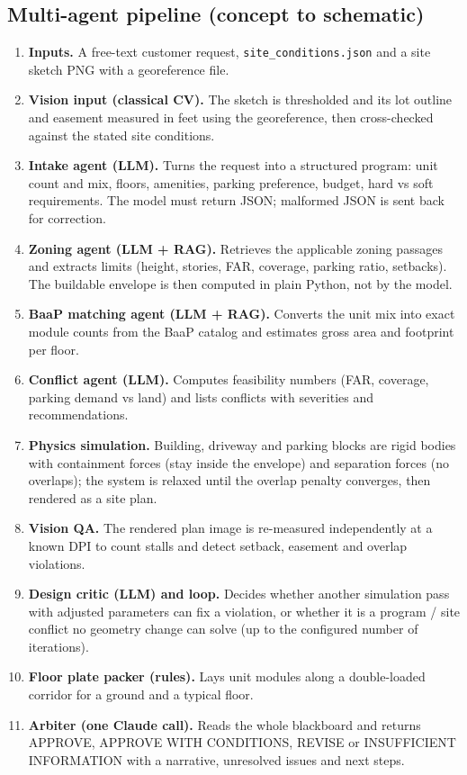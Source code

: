 \documentclass[10pt]{article}
\begin{document}
\subsection{Multi-agent pipeline (concept to schematic)}
\begin{enumerate}
\item \textbf{Inputs.} A free-text customer request, \texttt{site\_conditions.json} and a site sketch PNG with a georeference file.
\item \textbf{Vision input (classical CV).} The sketch is thresholded and its lot outline and easement measured in feet using the georeference, then cross-checked against the stated site conditions.
\item \textbf{Intake agent (LLM).} Turns the request into a structured program: unit count and mix, floors, amenities, parking preference, budget, hard vs soft requirements. The model must return JSON; malformed JSON is sent back for correction.
\item \textbf{Zoning agent (LLM + RAG).} Retrieves the applicable zoning passages and extracts limits (height, stories, FAR, coverage, parking ratio, setbacks). The buildable envelope is then computed in plain Python, not by the model.
\item \textbf{BaaP matching agent (LLM + RAG).} Converts the unit mix into exact module counts from the BaaP catalog and estimates gross area and footprint per floor.
\item \textbf{Conflict agent (LLM).} Computes feasibility numbers (FAR, coverage, parking demand vs land) and lists conflicts with severities and recommendations.
\item \textbf{Physics simulation.} Building, driveway and parking blocks are rigid bodies with containment forces (stay inside the envelope) and separation forces (no overlaps); the system is relaxed until the overlap penalty converges, then rendered as a site plan.
\item \textbf{Vision QA.} The rendered plan image is re-measured independently at a known DPI to count stalls and detect setback, easement and overlap violations.
\item \textbf{Design critic (LLM) and loop.} Decides whether another simulation pass with adjusted parameters can fix a violation, or whether it is a program / site conflict no geometry change can solve (up to the configured number of iterations).
\item \textbf{Floor plate packer (rules).} Lays unit modules along a double-loaded corridor for a ground and a typical floor.
\item \textbf{Arbiter (one Claude call).} Reads the whole blackboard and returns APPROVE, APPROVE WITH CONDITIONS, REVISE or INSUFFICIENT INFORMATION with a narrative, unresolved issues and next steps.
\end{enumerate}
\end{document}
